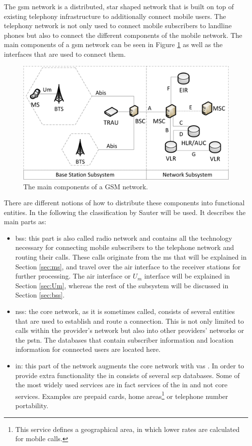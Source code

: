 The \gls{gsm} network is a distributed, star shaped network that is built on top of existing telephony infrastructure to additionally connect mobile users.
The telephony network is not only used to connect mobile subscribers to landline phones but also to connect the different components of the mobile network.
The main components of a \gls{gsm} network can be seen in Figure \ref{fig:gsm_network} as well as the interfaces that are used to connect them.
\begin{figure}
\centering
\includegraphics{../Images/Architecture}
\caption{The main components of a GSM network.}
\label{fig:gsm_network}
\end{figure}
There are different notions of how to distribute these components into functional entities.
In the following the classification by Sauter \cite{kommsys2006} will be used.
It describes the main parts as:
\begin{itemize}
	\item \gls{bss}: this part is also called radio network and contains all the technology necessary for connecting mobile subscribers to the telephone network and routing their calls. 
	These calls originate from the \gls{ms} that will be explained in Section \ref{sec:ms}, and travel over the air interface to the receiver stations for further processing.
	The air interface or $U_m$ interface will be explained in Section \ref{sec:Um}, whereas the rest of the subsystem will be discussed in Section \ref{sec:bss}.
	\item \gls{nss}: the core network, as it is sometimes called, consists of several entities that are used to establish and route a connection.
	This is not only limited to calls within the provider's network but also into other providers' networks or the \gls{pstn}.
	The databases that contain subscriber information and location information for connected users are located here.
	\item \gls{in}: this part of the network augments the core network with \gls{vas} \cite{ITU1200}.
	In order to provide extra functionality the \gls{in} consists of several \gls{scp} databases.
	Some of the most widely used services are in fact services of the \gls{in} and not core services.
	Examples are prepaid cards, home areas\footnote{This service defines a geographical area, in which lower rates are calculated for mobile calls.} or telephone number portability.
\end{itemize}
